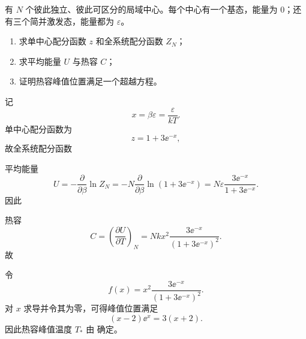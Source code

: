 \begin{question}[16分]
有 $N$ 个彼此独立、彼此可区分的局域中心。每个中心有一个基态，能量为 $0$；还有三个简并激发态，能量都为 $\varepsilon$。
\begin{enumerate}[label=(\arabic*),leftmargin=2.8em,itemsep=0.2em]
\item 求单中心配分函数 $z$ 和全系统配分函数 $Z_N$；
\item 求平均能量 $U$ 与热容 $C$；
\item 证明热容峰值位置满足一个超越方程。
\end{enumerate}
\begin{solution}

记
\[
x=\beta\varepsilon=\frac{\varepsilon}{kT}.
\]
单中心配分函数为
\[
z=1+3\ee^{-x},
\]
故全系统配分函数

平均能量
\[
U=-\frac{\partial}{\partial \beta}\ln Z_N
=-N\frac{\partial}{\partial \beta}\ln(1+3\ee^{-x})
=N\varepsilon\frac{3\ee^{-x}}{1+3\ee^{-x}}.
\]
因此

热容
\[
C=\left(\frac{\partial U}{\partial T}\right)_N
=Nkx^2\frac{3\ee^{-x}}{(1+3\ee^{-x})^2}.
\]
故

令
\[
f(x)=x^2\frac{3\ee^{-x}}{(1+3\ee^{-x})^2}.
\]
对 $x$ 求导并令其为零，可得峰值位置满足
\[
( x-2)\ee^x=3(x+2).
\]
因此热容峰值温度 $T_\ast$ 由
确定。
\end{solution}
\end{question}

